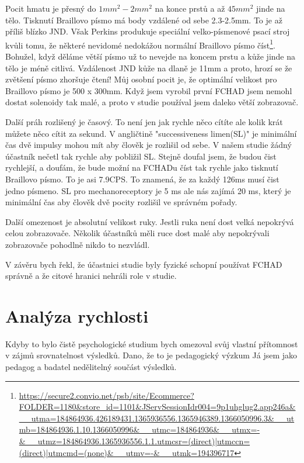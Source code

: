 Pocit hmatu je přesný do ${}1mm^2 - 2mm^2$ na konce prstů a až ${}45mm^2$ jinde na tělo.  Tisknutí Braillovo písmo má body vzdálené od sebe 2.3-2.5mm\citep{brailleautority}. To je až příliš blízko JND.  Však Perkins produkuje speciální velko-písmenové psací stroj kvůli tomu, že některé nevidomé nedokážou normální Braillovo písmo číst\footnote{\url{https://secure2.convio.net/psb/site/Ecommerce?FOLDER=1180&store_id=1101&JServSessionIdr004=9p1uhglug2.app246a&__utma=184864936.426189431.1365936556.1365946389.1366050996.3&__utmb=184864936.1.10.1366050996&__utmc=184864936&__utmx=-&__utmz=184864936.1365936556.1.1.utmcsr=(direct)|utmccn=(direct)|utmcmd=(none)&__utmv=-&__utmk=194396717}}.  Bohužel, když děláme větší písmo už to nevejde na koncem prstu a kůže jinde na tělo je méně citlivá.  Vzdálenost JND kůže na dlaně je 11mm a proto, hrozí se že zvětšení písmo zhoršuje čtení! Můj osobní pocit je, že optimální velikost pro Braillovo písmo je 500 x 300mm.  Když jsem vyrobil první FCHAD jsem nemohl dostat solenoidy tak malé, a proto v studie používal jsem daleko větší zobrazovač\citep[str. 30-32]{nielsen2008gesture}.

Další práh rozlišený je časový.  To není jen jak rychle něco cítíte ale kolik krát můžete něco cítit za sekund.  V angličtině "successiveness limen(SL)" je minimální čas dvě impulsy mohou mít aby člověk je rozlišil od sebe.  V našem studie žádný účastník nečetl tak rychle aby pobližil SL.  Stejně doufal jsem, že budou čist rychlejší, a doufám, že bude možní na FCHADu číst tak rychle jako tisknutí Braillovo písmo.  To je asi 7.9CPS\citep{wetzel2006studies}.  To znamená, že za každý 126ms musí čist jedno písmeno.  SL pro mechanoreceptory je 5 ms ale nás zajímá 20 ms, který je minimální čas aby člověk dvě pocity rozlišil ve správném pořady\citep[str. 32]{nielsen2008gesture}.

Další omezenost je absolutní velikost ruky.  Jestli ruka není dost velká nepokrývá celou zobrazovače.  Několik účastníků měli ruce dost malé aby nepokrývali zobrazovače pohodlně nikdo to nezvládl.

V závěru bych řekl, že účastnici studie byly fyzické schopní používat FCHAD správně a že citové hranici nehráli role v studie.


\section{Analýza rychlosti}
Kdyby to bylo čistě psychologické studium bych omezoval svůj vlastní přítomnost v zájmů srovnatelnost výsledků.  Dano, že to je pedagogický výzkum Já jsem jako pedagog a badatel nedělitelný součást výsledků.

